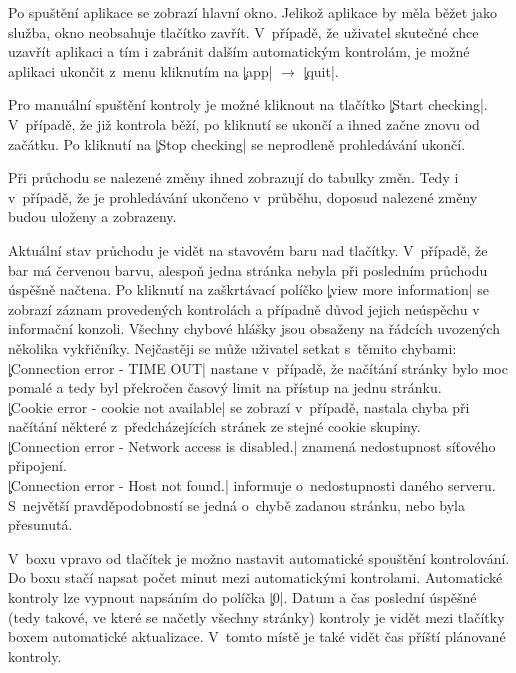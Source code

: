 Po spuštění aplikace se zobrazí hlavní okno.
Jelikož aplikace by měla běžet jako služba, okno neobsahuje tlačítko zavřít.
V~případě, že uživatel skutečné chce uzavřít aplikaci a tím i zabránit dalším automatickým kontrolám, je možné aplikaci ukončit z~menu kliknutím na \c|app| $\rightarrow$ \c|quit|.

Pro manuální spuštění kontroly je možné kliknout na tlačítko \c|Start checking|.
V~případě, že již kontrola běží, po kliknutí se ukončí a ihned začne znovu od začátku.
Po kliknutí na \c|Stop checking| se neprodleně prohledávání ukončí.

Při průchodu se nalezené změny ihned zobrazují do tabulky změn.
Tedy i v~případě, že je prohledávání ukončeno v~průběhu, doposud nalezené změny budou uloženy a zobrazeny.

Aktuální stav průchodu je vidět na stavovém baru  nad tlačítky.
V~případě, že bar má červenou barvu, alespoň jedna stránka nebyla při posledním průchodu úspěšně načtena.
Po kliknutí na zaškrtávací políčko \c|view more information| se zobrazí záznam provedených kontrolách a případně důvod jejich neúspěchu v informační konzoli.
Všechny chybové hlášky jsou obsaženy na řádcích uvozených několika vykřičníky.
Nejčastěji se může uživatel setkat s~těmito chybami:\\
\c|Connection error - TIME OUT| nastane v~případě, že načítání stránky bylo moc pomalé a tedy byl překročen časový limit na přístup na jednu stránku.\\ %
\c|Cookie error - cookie not available| se zobrazí v~případě, nastala chyba při načítání některé z~předcházejících stránek ze stejné cookie skupiny.\\
\c|Connection error - Network access is disabled.| znamená nedostupnost síťového připojení.\\
\c|Connection error - Host not found.| informuje o~nedostupnosti daného serveru. S~největší pravděpodobností se  jedná o~chybě zadanou stránku, nebo byla přesunutá.

V~boxu vpravo od tlačítek je možno nastavit automatické spouštění kontrolování.
Do boxu stačí napsat počet minut mezi automatickými kontrolami.
Automatické kontroly lze vypnout napsáním do políčka \c|0|.
Datum a čas poslední úspěšné (tedy takové, ve které se načetly všechny stránky) kontroly je vidět mezi tlačítky boxem automatické aktualizace.
V~tomto místě je také vidět čas příští plánované kontroly.

